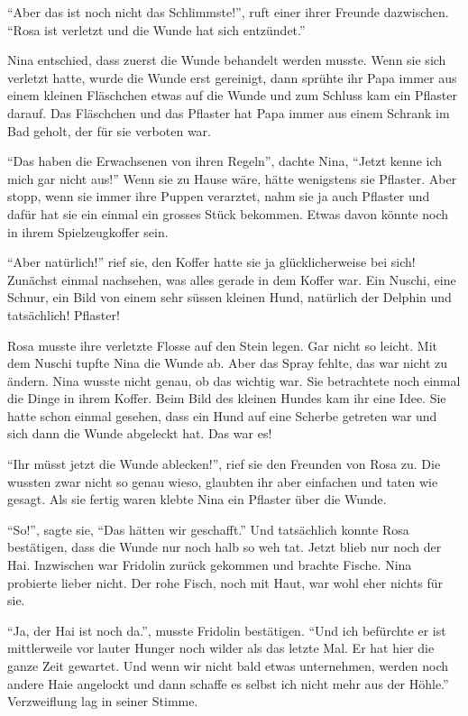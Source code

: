 \enquote{Aber das ist noch nicht das Schlimmste!}, ruft einer ihrer Freunde dazwischen. \enquote{Rosa ist verletzt und die Wunde hat sich entzündet.}

Nina entschied, dass zuerst die Wunde behandelt werden musste. Wenn sie sich verletzt hatte, wurde die Wunde erst gereinigt, dann sprühte ihr Papa immer aus einem kleinen Fläschchen etwas auf die Wunde und zum Schluss kam ein Pflaster darauf. Das Fläschchen und das Pflaster hat Papa immer aus einem Schrank im Bad geholt, der für sie verboten war. 

\enquote{Das haben die Erwachsenen von ihren Regeln}, dachte Nina, \enquote{Jetzt kenne ich mich gar nicht aus!} Wenn sie zu Hause wäre, hätte wenigstens sie Pflaster. Aber stopp, wenn sie immer ihre Puppen verarztet, nahm sie ja auch Pflaster und dafür hat sie ein einmal ein grosses Stück bekommen. Etwas davon könnte noch in ihrem Spielzeugkoffer sein.

\enquote{Aber natürlich!} rief sie, den Koffer hatte sie ja glücklicherweise bei sich! Zunächst einmal nachsehen, was alles gerade in dem Koffer war. Ein Nuschi, eine Schnur, ein Bild von einem sehr süssen kleinen Hund, natürlich der Delphin und tatsächlich! Pflaster! 

Rosa musste ihre verletzte Flosse auf den Stein legen. Gar nicht so leicht. Mit dem Nuschi tupfte Nina die Wunde ab. Aber das Spray fehlte, das war nicht zu ändern. Nina wusste nicht genau, ob das wichtig war. Sie betrachtete noch einmal die Dinge in ihrem Koffer. Beim Bild des kleinen Hundes kam ihr eine Idee. Sie hatte schon einmal gesehen, dass ein Hund auf eine Scherbe getreten war und sich dann die Wunde abgeleckt hat. Das war es!

\enquote{Ihr müsst jetzt die Wunde ablecken!}, rief sie den Freunden von Rosa zu. Die wussten zwar nicht so genau wieso, glaubten ihr aber einfachen und taten wie gesagt. Als sie fertig waren klebte Nina ein Pflaster über die Wunde.

\enquote{So!}, sagte sie, \enquote{Das hätten wir geschafft.} Und tatsächlich konnte Rosa bestätigen, dass die Wunde nur noch halb so weh tat. Jetzt blieb nur noch der Hai. Inzwischen war Fridolin zurück gekommen und brachte Fische. Nina probierte lieber nicht. Der rohe Fisch, noch mit Haut, war wohl eher nichts für sie.

\enquote{Ja, der Hai ist noch da.}, musste Fridolin bestätigen. \enquote{Und ich befürchte er ist mittlerweile vor lauter Hunger noch wilder als das letzte Mal. Er hat hier die ganze Zeit gewartet. Und wenn wir nicht bald etwas unternehmen, werden noch andere Haie angelockt und dann schaffe es selbst ich nicht mehr aus der Höhle.} Verzweiflung lag in seiner Stimme.

